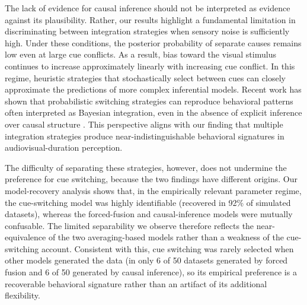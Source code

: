 \documentclass{jov}
\providecommand{\citep}[1]{\cite{#1}}
\begin{document}
The lack of evidence for causal inference should not be interpreted as evidence against its plausibility. Rather, our results highlight a fundamental limitation in discriminating between integration strategies when sensory noise is sufficiently high. Under these conditions, the posterior probability of separate causes remains low even at large cue conflicts. As a result, bias toward the visual stimulus continues to increase approximately linearly with increasing cue conflict. In this regime, heuristic strategies that stochastically select between cues can closely approximate the predictions of more complex inferential models. Recent work has shown that probabilistic switching strategies can reproduce behavioral patterns often interpreted as Bayesian integration, even in the absence of explicit inference over causal structure \citep{ni2024computational}. This perspective aligns with our finding that multiple integration strategies produce near-indistinguishable behavioral signatures in audiovisual-duration perception.

The difficulty of separating these strategies, however, does not undermine the preference for cue switching, because the two findings have different origins. Our model-recovery analysis shows that, in the empirically relevant parameter regime, the cue-switching model was highly identifiable (recovered in 92\% of simulated datasets), whereas the forced-fusion and causal-inference models were mutually confusable. The limited separability we observe therefore reflects the near-equivalence of the two averaging-based models rather than a weakness of the cue-switching account. Consistent with this, cue switching was rarely selected when other models generated the data (in only 6 of 50 datasets generated by forced fusion and 6 of 50 generated by causal inference), so its empirical preference is a recoverable behavioral signature rather than an artifact of its additional flexibility.


\end{document}
